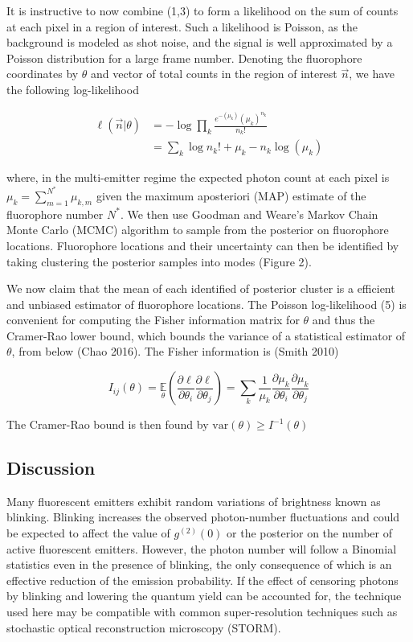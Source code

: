 \documentclass[a4paper, twocolumn, superscriptaddress,prl]{revtex4}  %
\begin{document}
It is instructive to now combine (1,3) to form a likelihood on the sum of counts at each pixel in a region of interest. Such a likelihood is Poisson, as the background is modeled as shot noise, and the signal is well approximated by a Poisson distribution for a large frame number. Denoting the fluorophore coordinates by $\theta$ and vector of total counts in the region of interest $\vec{n}$, we have the following log-likelihood

\begin{align}
\ell(\vec{n}|\theta) &= -\log \prod_{k} \frac{e^{-\left(\mu_{k}\right)}\left(\mu_{k}\right)^{n_{k}}}{n_{k}!}\\
&= \sum_{k}  \log n_{k}! + \mu_{k} - n_{k}\log\left(\mu_{k}\right)
\end{align}

where, in the multi-emitter regime the expected photon count at each pixel is $\mu_{k} = \sum_{m=1}^{N^{*}} \mu_{k,m}$ given the maximum aposteriori (MAP) estimate of the fluorophore number $N^{*}$. We then use Goodman and Weare's Markov Chain Monte Carlo (MCMC) algorithm to sample from the posterior on fluorophore locations. Fluorophore locations and their uncertainty can then be identified by taking clustering the posterior samples into modes (Figure 2). 

We now claim that the mean of each identified of posterior cluster is a efficient and unbiased estimator of fluorophore locations. The Poisson log-likelihood (5) is convenient for computing the Fisher information matrix for $\theta$ and thus the Cramer-Rao lower bound, which bounds the variance of a statistical estimator of $\theta$, from below (Chao 2016). The Fisher information is (Smith 2010)

\begin{equation}
I_{ij}(\theta) = \underset{\theta}{\mathbb{E}}\left(\frac{\partial \ell}{\partial\theta_{i}}\frac{\partial\ell}{\partial\theta_{j}}\right) = \sum_{k}\frac{1}{\mu_{k}}\frac{\partial \mu_{k}}{\partial\theta_{i}}\frac{\partial \mu_{k}}{\partial\theta_{j}}
\end{equation}

The Cramer-Rao bound is then found by $\mathrm{var}(\theta) \geq I^{-1}(\theta)$

\subsection{Discussion}

Many fluorescent emitters exhibit random variations of brightness known as blinking. Blinking increases the observed photon-number fluctuations and could be expected to affect the value of $g^{(2)}(0)$ or the posterior on the number of active fluorescent emitters. However, the photon number will follow a Binomial statistics even in the presence of blinking, the only consequence of which is an effective reduction of the emission probability. If the effect of censoring photons by blinking and lowering the quantum yield can be accounted for, the technique used here may be compatible with common super-resolution techniques such as stochastic optical reconstruction microscopy (STORM). 
\end{document}
